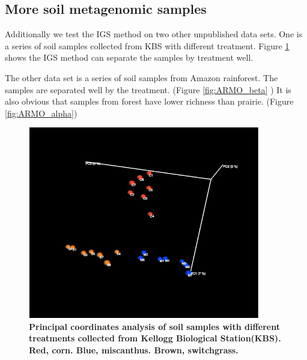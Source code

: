 


\subsection{More soil metagenomic samples}

Additionally we test the IGS method on two other unpublished data sets. 
One is a series of soil samples
collected from KBS with different treatment. Figure \ref{fig:KBS_beta}
shows the IGS method can separate
the samples by treatment well. 

The other data set is a series of soil samples from Amazon rainforest. 
The samples are separated well
by the treatment. (Figure \ref{fig:ARMO_beta} ) It is also obvious 
that samples from forest have 
lower richness than prairie.  (Figure \ref{fig:ARMO_alpha})




\begin{figure}[!ht]
 \centerline{\includegraphics[width=4in]{./figures/IGS_KBS_beta.png}}
\caption{\bf  Principal coordinates analysis of soil samples with different
treatments collected from Kellogg Biological Station(KBS). Red, corn. Blue,
miscanthus. Brown, switchgrass.}
\label{fig:KBS_beta}
\end{figure}

